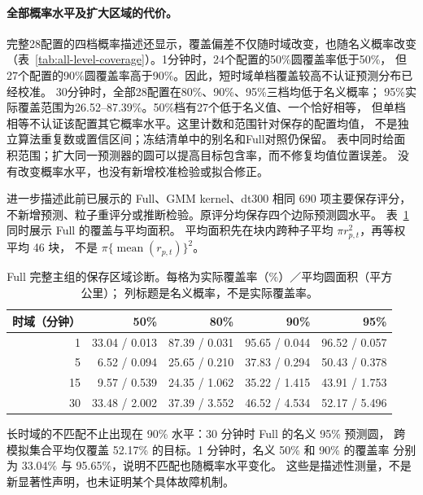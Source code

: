 \paragraph{全部概率水平及扩大区域的代价。}
完整28配置的四档概率描述还显示，覆盖偏差不仅随时域改变，也随名义概率改变
（表~\ref{tab:all-level-coverage}）。1分钟时，24个配置的50\%圆覆盖率低于50\%，
但27个配置的90\%圆覆盖率高于90\%。因此，短时域单档覆盖较高不认证预测分布已经校准。
30分钟时，全部28配置在80\%、90\%、95\%三档均低于名义概率；
95\%实际覆盖范围为26.52--87.39\%。50\%档有27个低于名义值、一个恰好相等，
但单档相等不认证该配置其它概率水平。这里计数和范围针对保存的配置均值，
不是独立算法重复数或置信区间；冻结清单中的别名和Full对照仍保留。
表中同时给面积范围；扩大同一预测器的圆可以提高目标包含率，而不修复均值位置误差。
没有改变概率水平，也没有新增校准检验或拟合修正。

进一步描述此前已展示的 Full、GMM kernel、dt300 相同 690 项主要保存评分，
不新增预测、粒子重评分或推断检验。原评分均保存四个边际预测圆水平。
表~\ref{tab:full-calibration-area} 同时展示 Full 的覆盖与平均面积。
平均面积先在块内跨种子平均 \(\pi r_{p,t}^2\)，再等权平均 46 块，
不是 \(\pi\{\operatorname{mean}(r_{p,t})\}^2\)。

\begin{table}[htbp]
\centering\small
\caption{Full 完整主组的保存区域诊断。每格为实际覆盖率（\%）／平均圆面积（平方公里）；
列标题是名义概率，不是实际覆盖率。}
\label{tab:full-calibration-area}\hypertarget{tab:full-calibration-area}{}
\begin{tabular}{rrrrr}
\toprule
时域（分钟） & 50\% & 80\% & 90\% & 95\%\\
\midrule
1 & 33.04 / 0.013 & 87.39 / 0.031 & 95.65 / 0.044 & 96.52 / 0.057\\
5 & 6.52 / 0.094 & 25.65 / 0.210 & 37.83 / 0.294 & 50.43 / 0.378\\
15 & 9.57 / 0.539 & 24.35 / 1.062 & 35.22 / 1.415 & 43.91 / 1.753\\
30 & 33.48 / 2.002 & 37.39 / 3.552 & 46.52 / 4.534 & 52.17 / 5.496\\
\bottomrule
\end{tabular}
\end{table}

长时域的不匹配不止出现在 90\% 水平：30 分钟时 Full 的名义 95\% 预测圆，
跨模拟集合平均仅覆盖 52.17\% 的目标。1 分钟时，名义 50\% 和 90\% 的覆盖率
分别为 33.04\% 与 95.65\%，说明不匹配也随概率水平变化。
这些是描述性测量，不是新显著性声明，也未证明某个具体故障机制。

